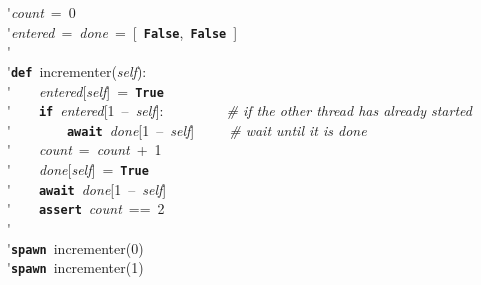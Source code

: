 \'\>\textit{count}~=~0\\

\'\>\textit{entered}~=~\textit{done}~=~[~\texttt{\textbf{False}},~\texttt{\textbf{False}}~]\\

\'\>\\

\'\>\texttt{\textbf{def}}~incrementer(\textit{self}):\\

\'\>~~~~\textit{entered}[\textit{self}]~=~\texttt{\textbf{True}}\\

\'\>~~~~\texttt{\textbf{if}}~\textit{entered}[1~--~\textit{self}]:~~~~~~~~~\emph{\# if the other thread has already started}\\

\'\>~~~~~~~~\texttt{\textbf{await}}~\textit{done}[1~--~\textit{self}]~~~~~\emph{\# wait until it is done}\\

\'\>~~~~\textit{count}~=~\textit{count}~+~1\\

\'\>~~~~\textit{done}[\textit{self}]~=~\texttt{\textbf{True}}\\

\'\>~~~~\texttt{\textbf{await}}~\textit{done}[1~--~\textit{self}]\\

\'\>~~~~\texttt{\textbf{assert}}~\textit{count}~==~2\\

\'\>\\

\'\>\texttt{\textbf{spawn}}~incrementer(0)\\

\'\>\texttt{\textbf{spawn}}~incrementer(1)